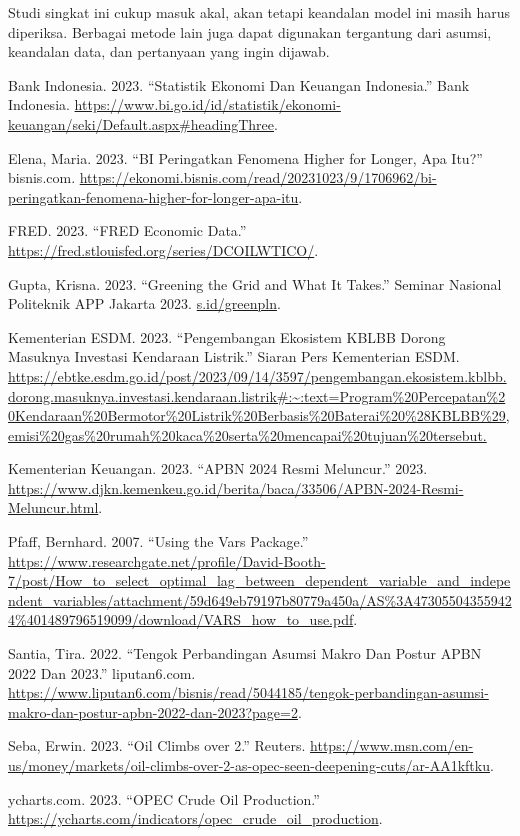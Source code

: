\documentclass[
  a4paper,
  DIV=11,
  numbers=noendperiod]{scrreprt}
\newlength{\cslhangindent}
\newlength{\cslentryspacingunit} %
\newenvironment{CSLReferences}[2] %
 {%
  \setlength{\parindent}{0pt}
  \ifodd #1
  \let\oldpar\par
  \def\par{\hangindent=\cslhangindent\oldpar}
  \fi
  \setlength{\parskip}{#2\cslentryspacingunit}
 }%
 {}
\begin{document}
Studi singkat ini cukup masuk akal, akan tetapi keandalan model ini
masih harus diperiksa. Berbagai metode lain juga dapat digunakan
tergantung dari asumsi, keandalan data, dan pertanyaan yang ingin
dijawab.

\hypertarget{refs}{}
\begin{CSLReferences}{1}{0}
\leavevmode{}%
Bank Indonesia. 2023. {``Statistik Ekonomi Dan Keuangan Indonesia.''}
Bank Indonesia.
\url{https://www.bi.go.id/id/statistik/ekonomi-keuangan/seki/Default.aspx\#headingThree}.

\leavevmode{}%
Elena, Maria. 2023. {``BI Peringatkan Fenomena Higher for Longer, Apa
Itu?''} bisnis.com.
\url{https://ekonomi.bisnis.com/read/20231023/9/1706962/bi-peringatkan-fenomena-higher-for-longer-apa-itu}.

\leavevmode{}%
FRED. 2023. {``FRED Economic Data.''}
\url{https://fred.stlouisfed.org/series/DCOILWTICO/}.

\leavevmode{}%
Gupta, Krisna. 2023. {``Greening the Grid and What It Takes.''} Seminar
Nasional Politeknik APP Jakarta 2023.
\href{https://s.id/greenpln}{s.id/greenpln}.

\leavevmode{}%
Kementerian ESDM. 2023. {``Pengembangan Ekosistem KBLBB Dorong Masuknya
Investasi Kendaraan Listrik.''} Siaran Pers Kementerian ESDM.
\url{https://ebtke.esdm.go.id/post/2023/09/14/3597/pengembangan.ekosistem.kblbb.dorong.masuknya.investasi.kendaraan.listrik\#:~:text=Program\%20Percepatan\%20Kendaraan\%20Bermotor\%20Listrik\%20Berbasis\%20Baterai\%20\%28KBLBB\%29,emisi\%20gas\%20rumah\%20kaca\%20serta\%20mencapai\%20tujuan\%20tersebut.}

\leavevmode{}%
Kementerian Keuangan. 2023. {``APBN 2024 Resmi Meluncur.''} 2023.
\url{https://www.djkn.kemenkeu.go.id/berita/baca/33506/APBN-2024-Resmi-Meluncur.html}.

\leavevmode{}%
Pfaff, Bernhard. 2007. {``Using the Vars Package.''}
\url{https://www.researchgate.net/profile/David-Booth-7/post/How_to_select_optimal_lag_between_dependent_variable_and_independent_variables/attachment/59d649eb79197b80779a450a/AS\%3A473055043559424\%401489796519099/download/VARS_how_to_use.pdf}.

\leavevmode{}%
Santia, Tira. 2022. {``Tengok Perbandingan Asumsi Makro Dan Postur APBN
2022 Dan 2023.''} liputan6.com.
\url{https://www.liputan6.com/bisnis/read/5044185/tengok-perbandingan-asumsi-makro-dan-postur-apbn-2022-dan-2023?page=2}.

\leavevmode{}%
Seba, Erwin. 2023. {``Oil Climbs over 2.''} Reuters.
\url{https://www.msn.com/en-us/money/markets/oil-climbs-over-2-as-opec-seen-deepening-cuts/ar-AA1kftku}.

\leavevmode{}%
ycharts.com. 2023. {``OPEC Crude Oil Production.''}
\url{https://ycharts.com/indicators/opec_crude_oil_production}.

\end{CSLReferences}
\end{document}
